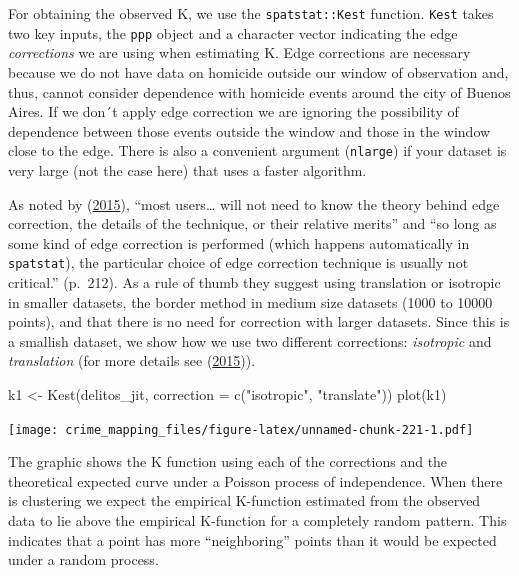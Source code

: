 \documentclass[
  krantz2]{krantz}
\makeatletter
\newenvironment{Shaded}{\begin{snugshade}}{\end{snugshade}}
\newcommand{\AttributeTok}[1]{\textcolor[rgb]{0.61,0.61,0.61}{#1}}
\newcommand{\FunctionTok}[1]{\textcolor[rgb]{0,0,0}{#1}}
\newcommand{\NormalTok}[1]{#1}
\newcommand{\OtherTok}[1]{\textcolor[rgb]{0.37,0.37,0.37}{#1}}
\newcommand{\StringTok}[1]{\textcolor[rgb]{0.5,0.5,0.5}{#1}}
\newenvironment{kframe}{%
\medskip{}
\setlength{\fboxsep}{.8em}
 \def\at@end@of@kframe{}%
 \ifinner\ifhmode%
  \def\at@end@of@kframe{\end{minipage}}%
  \begin{minipage}{\columnwidth}%
 \fi\fi%
 \def\FrameCommand##1{\hskip\@totalleftmargin \hskip-\fboxsep
 \colorbox{shadecolor}{##1}\hskip-\fboxsep
     \hskip-\linewidth \hskip-\@totalleftmargin \hskip\columnwidth}%
 \MakeFramed {\advance\hsize-\width
   \@totalleftmargin\z@ \linewidth\hsize
   \@setminipage}}%
 {\par\unskip\endMakeFramed%
 \at@end@of@kframe}
\renewenvironment{Shaded}{\begin{kframe}}{\end{kframe}}
\makeatother
\begin{document}
For obtaining the observed K, we use the \texttt{spatstat::Kest} function. \texttt{Kest} takes two key inputs, the \texttt{ppp} object and a character vector indicating the edge \emph{corrections} we are using when estimating K. Edge corrections are necessary because we do not have data on homicide outside our window of observation and, thus, cannot consider dependence with homicide events around the city of Buenos Aires. If we don´t apply edge correction we are ignoring the possibility of dependence between those events outside the window and those in the window close to the edge. There is also a convenient argument (\texttt{nlarge}) if your dataset is very large (not the case here) that uses a faster algorithm.

As noted by (\protect\hyperlink{ref-Baddeley_2016}{2015}), ``most users\ldots{} will not need to know the theory behind edge correction, the details of the technique, or their relative merits'' and ``so long as some kind of edge correction is performed (which happens automatically in \texttt{spatstat}), the particular choice of edge correction technique is usually not critical.'' (p.~212). As a rule of thumb they suggest using translation or isotropic in smaller datasets, the border method in medium size datasets (1000 to 10000 points), and that there is no need for correction with larger datasets. Since this is a smallish dataset, we show how we use two different corrections: \emph{isotropic} and \emph{translation} (for more details see (\protect\hyperlink{ref-Baddeley_2016}{2015})).

\begin{Shaded}
\begin{Highlighting}[]
\NormalTok{k1 }\OtherTok{\textless{}{-}} \FunctionTok{Kest}\NormalTok{(delitos\_jit, }\AttributeTok{correction =} \FunctionTok{c}\NormalTok{(}\StringTok{"isotropic"}\NormalTok{, }\StringTok{"translate"}\NormalTok{))}
\FunctionTok{plot}\NormalTok{(k1)}
\end{Highlighting}
\end{Shaded}

\texttt{[image: crime\_mapping\_files/figure-latex/unnamed-chunk-221-1.pdf]}

The graphic shows the K function using each of the corrections and the theoretical expected curve under a Poisson process of independence. When there is clustering we expect the empirical K-function estimated from the observed data to lie above the empirical K-function for a completely random pattern. This indicates that a point has more ``neighboring'' points than it would be expected under a random process.
\end{document}
